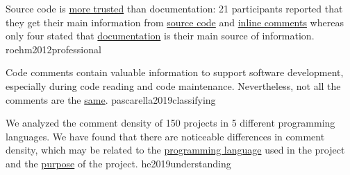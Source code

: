 \documentclass{article}
\begin{document}

  {Source code is \ul{more trusted} than documentation: 21 participants reported that they get their main information from \ul{source code} and \ul{inline comments} whereas only four stated that \ul{documentation} is their main source of information.}
  {roehm2012professional}

  {Code comments contain valuable information to support software development, especially during code reading and code maintenance. Nevertheless, not all the comments are the \ul{same}.}
  {pascarella2019classifying}


  {We analyzed the comment density of 150 projects in 5 different programming languages. We have found that there are noticeable differences in comment density, which may be related to the \ul{programming language} used in the project and the \ul{purpose} of the project.}
  {he2019understanding}

\end{document}
